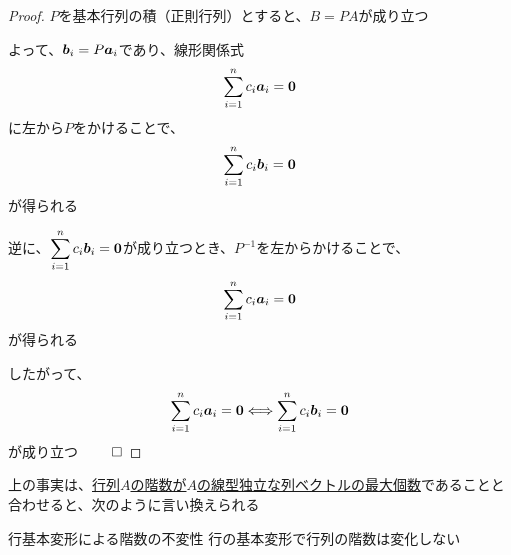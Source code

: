\documentclass[../../../topic_linear-algebra]{subfiles}
\begin{document}
\begin{proof}
  $P$を基本行列の積（正則行列）とすると、$B = PA$が成り立つ

  \br

  よって、$\vb*{b}_i = P \vb*{a}_i$であり、線形関係式
  \begin{equation*}
    \sum_{i=1}^n c_i \vb*{a}_i = \vb*{0}
  \end{equation*}
  に左から$P$をかけることで、
  \begin{equation*}
    \sum_{i=1}^n c_i \vb*{b}_i = \vb*{0}
  \end{equation*}
  が得られる

  \br

  逆に、$\displaystyle\sum_{i=1}^n c_i \vb*{b}_i = \vb*{0}$が成り立つとき、$P^{-1}$を左からかけることで、
  \begin{equation*}
    \sum_{i=1}^n c_i \vb*{a}_i = \vb*{0}
  \end{equation*}
  が得られる

  \br

  したがって、
  \begin{equation*}
    \sum_{i=1}^n c_i \vb*{a}_i = \vb*{0} \Longleftrightarrow \sum_{i=1}^n c_i \vb*{b}_i = \vb*{0}
  \end{equation*}
  が成り立つ $\qed$
\end{proof}

\br

上の事実は、\hyperref[thm:rank-equals-max-indep-cols]{行列$A$の階数が$A$の線型独立な列ベクトルの最大個数}であることと合わせると、次のように言い換えられる

\begin{theorem}{行基本変形による階数の不変性}
  行の基本変形で行列の階数は変化しない
\end{theorem}
\end{document}
